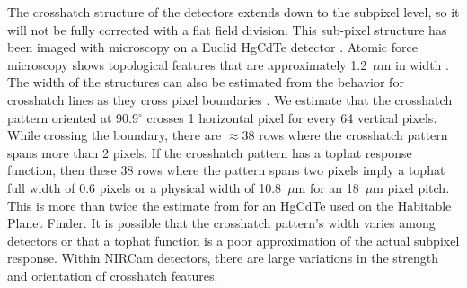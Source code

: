 \documentclass{aastex62}
\newcommand{\degree}{^\circ}
\begin{document}
The crosshatch structure of the detectors extends down to the subpixel level, so it will not be fully corrected with a flat field division.
This sub-pixel structure has been imaged with microscopy on a Euclid HgCdTe detector \citep{shapiro2018crosshatch}.
Atomic force microscopy shows topological features that are approximately 1.2~$\mu$m in width \citep{chang2008surfaceMorphologyHgCdTe}.
The width of the structures can also be estimated from the behavior for crosshatch lines as they cross pixel boundaries \citep{ninan2019crosshatchHPF}.
We estimate that the crosshatch pattern oriented at 90.9$\degree$ crosses 1 horizontal pixel for every 64 vertical pixels.
While crossing the boundary, there are $\approx 38$ rows where the crosshatch pattern spans more than 2 pixels.
If the crosshatch pattern has a tophat response function, then these 38 rows where the pattern spans two pixels imply a tophat full width of 0.6 pixels or a physical width of 10.8~$\mu$m for an 18~$\mu$m pixel pitch.
This is more than twice the estimate from \citet{ninan2019crosshatchHPF} for an HgCdTe used on the Habitable Planet Finder.
It is possible that the crosshatch pattern's width varies among detectors or that a tophat function is a poor approximation of the actual subpixel response.
Within NIRCam detectors, there are large variations in the strength and orientation of crosshatch features.
\end{document}
